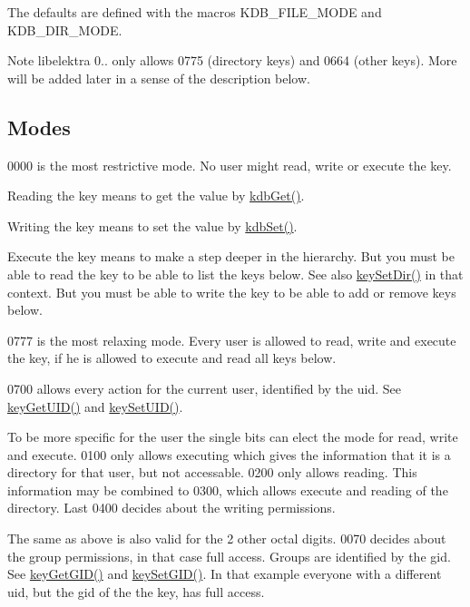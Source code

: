 The defaults are defined with the macros K\+D\+B\+\_\+\+F\+I\+L\+E\+\_\+\+M\+O\+D\+E and K\+D\+B\+\_\+\+D\+I\+R\+\_\+\+M\+O\+D\+E.

\begin{DoxyNote}{Note}
libelektra 0.. only allows 0775 (directory keys) and 0664 (other keys). More will be added later in a sense of the description below.
\end{DoxyNote}
\hypertarget{group__meta_mode}{}\subsection{Modes}\label{group__meta_mode}
0000 is the most restrictive mode. No user might read, write or execute the key.

Reading the key means to get the value by \hyperlink{group__kdb_ga28e385fd9cb7ccfe0b2f1ed2f62453a1}{kdb\+Get()}.

Writing the key means to set the value by \hyperlink{group__kdb_ga11436b058408f83d303ca5e996832bcf}{kdb\+Set()}.

Execute the key means to make a step deeper in the hierarchy. But you must be able to read the key to be able to list the keys below. See also \hyperlink{group__meta_gaae575bd86a628a15ee45baa860522e75}{key\+Set\+Dir()} in that context. But you must be able to write the key to be able to add or remove keys below.

0777 is the most relaxing mode. Every user is allowed to read, write and execute the key, if he is allowed to execute and read all keys below.

0700 allows every action for the current user, identified by the uid. See \hyperlink{group__meta_gacaa5060e67b03f50ae49a3620c54bc46}{key\+Get\+U\+I\+D()} and \hyperlink{group__meta_gab5f284f5ecd261e0a290095f50ba1af7}{key\+Set\+U\+I\+D()}.

To be more specific for the user the single bits can elect the mode for read, write and execute. 0100 only allows executing which gives the information that it is a directory for that user, but not accessable. 0200 only allows reading. This information may be combined to 0300, which allows execute and reading of the directory. Last 0400 decides about the writing permissions.

The same as above is also valid for the 2 other octal digits. 0070 decides about the group permissions, in that case full access. Groups are identified by the gid. See \hyperlink{group__meta_ga46a95e81d7d7f4e3eb59e60e5f3738c0}{key\+Get\+G\+I\+D()} and \hyperlink{group__meta_ga9e3d0fb3f7ba906e067727b9155d22e3}{key\+Set\+G\+I\+D()}. In that example everyone with a different uid, but the gid of the the key, has full access.

